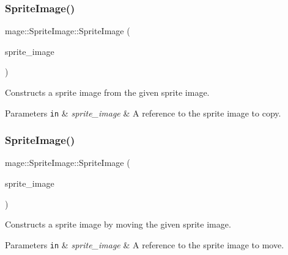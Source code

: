 \subsubsection{\texorpdfstring{Sprite\+Image()}{SpriteImage()}\hspace{0.1cm}{\footnotesize\ttfamily [5/6]}}
{\footnotesize\ttfamily mage\+::\+Sprite\+Image\+::\+Sprite\+Image (\begin{DoxyParamCaption}\item[{const \hyperlink{classmage_1_1_sprite_image}{Sprite\+Image} \&}]{sprite\+\_\+image }\end{DoxyParamCaption})}

Constructs a sprite image from the given sprite image.


\begin{DoxyParams}[1]{Parameters}
\mbox{\tt in}  & {\em sprite\+\_\+image} & A reference to the sprite image to copy. \\
\hline
\end{DoxyParams}
\hypertarget{classmage_1_1_sprite_image_aa8e053469bd4032560c315e9f2a7c14b}{}\label{classmage_1_1_sprite_image_aa8e053469bd4032560c315e9f2a7c14b} 
\subsubsection{\texorpdfstring{Sprite\+Image()}{SpriteImage()}\hspace{0.1cm}{\footnotesize\ttfamily [6/6]}}
{\footnotesize\ttfamily mage\+::\+Sprite\+Image\+::\+Sprite\+Image (\begin{DoxyParamCaption}\item[{\hyperlink{classmage_1_1_sprite_image}{Sprite\+Image} \&\&}]{sprite\+\_\+image }\end{DoxyParamCaption})\hspace{0.3cm}{\ttfamily [default]}}

Constructs a sprite image by moving the given sprite image.


\begin{DoxyParams}[1]{Parameters}
\mbox{\tt in}  & {\em sprite\+\_\+image} & A reference to the sprite image to move. \\
\hline
\end{DoxyParams}
\hypertarget{classmage_1_1_sprite_image_ac5e53addd73b174c6b23d3f0d63260c1}{}\label{classmage_1_1_sprite_image_ac5e53addd73b174c6b23d3f0d63260c1} 

